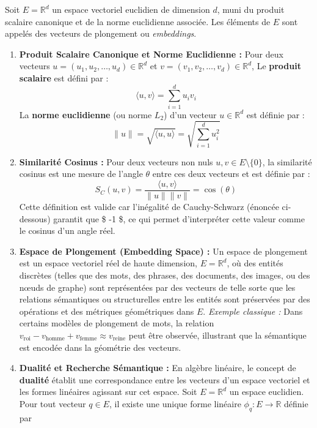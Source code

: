 \documentclass[11pt,a4paper]{report}
\begin{document}
Soit \(E = \mathbb{R}^d\) un espace vectoriel euclidien de dimension
\(d\), muni du produit scalaire canonique et de la norme euclidienne
associée. Les éléments de \(E\) sont appelés des vecteurs de plongement
ou \emph{embeddings}.

\begin{enumerate}
\def\labelenumi{\arabic{enumi}.}
\item
  \textbf{Produit Scalaire Canonique et Norme Euclidienne :} Pour deux
  vecteurs \(u = (u_1, u_2, \dots, u_d) \in \mathbb{R}^d\) et
  \(v = (v_1, v_2, \dots, v_d) \in \mathbb{R}^d\), Le \textbf{produit
  scalaire} est défini par :
  \[ \langle u, v \rangle = \sum_{i=1}^d u_i v_i \] La \textbf{norme
  euclidienne} (ou norme \(L_2\)) d'un vecteur \(u \in \mathbb{R}^d\)
  est définie par :
  \[ \|u\| = \sqrt{\langle u, u \rangle} = \sqrt{\sum_{i=1}^d u_i^2} \]
\item
  \textbf{Similarité Cosinus :} Pour deux vecteurs non nuls
  \(u, v \in E \setminus \{0\}\), la similarité cosinus est une mesure
  de l'angle \(\theta\) entre ces deux vecteurs et est définie par :
  \[ S_C(u, v) = \frac{\langle u, v \rangle}{\|u\| \|v\|} = \cos(\theta) \]
  Cette définition est valide car l'inégalité de Cauchy-Schwarz (énoncée
  ci-dessous) garantit que \$ -1
  \le {}  \$, ce qui permet
  d'interpréter cette valeur comme le cosinus d'un angle réel.
\item
  \textbf{Espace de Plongement (Embedding Space) :} Un espace de
  plongement est un espace vectoriel réel de haute dimension,
  \(E = \mathbb{R}^d\), où des entités discrètes (telles que des mots,
  des phrases, des documents, des images, ou des nœuds de graphe) sont
  représentées par des vecteurs de telle sorte que les relations
  sémantiques ou structurelles entre les entités sont préservées par des
  opérations et des métriques géométriques dans \(E\). \emph{Exemple
  classique :} Dans certains modèles de plongement de mots, la relation
  \(v_{\text{roi}} - v_{\text{homme}} + v_{\text{femme}} \approx v_{\text{reine}}\)
  peut être observée, illustrant que la sémantique est encodée dans la
  géométrie des vecteurs.
\item
  \textbf{Dualité et Recherche Sémantique :} En algèbre linéaire, le
  concept de \textbf{dualité} établit une correspondance entre les
  vecteurs d'un espace vectoriel et les formes linéaires agissant sur
  cet espace. Soit \(E = \mathbb{R}^d\) un espace euclidien. Pour tout
  vecteur \(q \in E\), il existe une unique forme linéaire
  \(\phi_q : E \to \mathbb{R}\) définie par

\end{enumerate}
\end{document}
